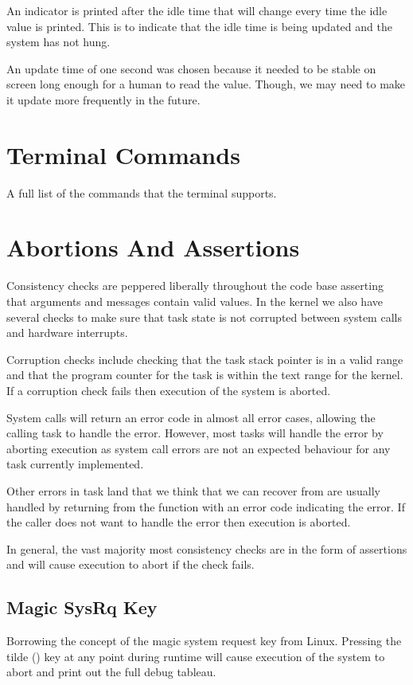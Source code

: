 \documentclass[pdftex,10pt,a4paper]{article}
\begin{document}
An indicator is printed after the idle time that will change every
time the idle value is printed. This is to indicate that the idle time
is being updated and the system has not hung.

An update time of one second was chosen because it needed to be stable
on screen long enough for a human to read the value. Though, we may
need to make it update more frequently in the future.

\section*{Terminal Commands}

A full list of the commands that the terminal supports.

\section*{Abortions And Assertions}

Consistency checks are peppered liberally throughout the code base
asserting that arguments and messages contain valid values. In the
kernel we also have several checks to make sure that task state is not
corrupted between system calls and hardware interrupts.

Corruption checks include checking that the task stack pointer is in a
valid range and that the program counter for the task is within the
text range for the kernel. If a corruption check fails then execution
of the system is aborted.

System calls will return an error code in almost all error cases,
allowing the calling task to handle the error. However, most tasks
will handle the error by aborting execution as system call errors are
not an expected behaviour for any task currently implemented.

Other errors in task land that we think that we can recover from are
usually handled by returning from the function with an error code
indicating the error. If the caller does not want to handle the error
then execution is aborted.

In general, the vast majority most consistency checks are in the form
of assertions and will cause execution to abort if the check fails.

\subsection*{Magic SysRq Key}

Borrowing the concept of the magic system request key from
Linux. Pressing the tilde () key at any point during runtime
will cause execution of the system to abort and print out the full
debug tableau.
\end{document}
